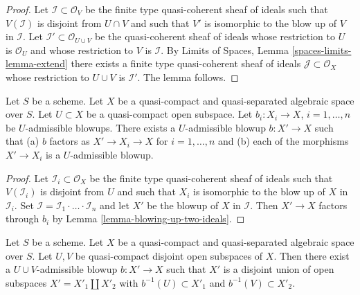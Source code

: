 \begin{proof}
Let $\mathcal{I} \subset \mathcal{O}_V$ be the finite type
quasi-coherent sheaf of ideals such that $V(\mathcal{I})$ is
disjoint from $U \cap V$ and such that $V'$ is isomorphic to the
blow up of $V$ in $\mathcal{I}$. Let
$\mathcal{I}' \subset \mathcal{O}_{U \cup V}$ be the quasi-coherent
sheaf of ideals whose restriction to $U$ is $\mathcal{O}_U$ and
whose restriction to $V$ is $\mathcal{I}$.
By Limits of Spaces, Lemma \ref{spaces-limits-lemma-extend}
there exists a finite type quasi-coherent sheaf of ideals
$\mathcal{J} \subset \mathcal{O}_X$ whose restriction to $U \cup V$ is
$\mathcal{I}'$. The lemma follows.
\end{proof}

\begin{lemma}
\label{lemma-dominate-admissible-blowups}
Let $S$ be a scheme.
Let $X$ be a quasi-compact and quasi-separated algebraic space over $S$.
Let $U \subset X$ be a quasi-compact open subspace.
Let $b_i : X_i \to X$, $i = 1, \ldots, n$ be $U$-admissible blowups.
There exists a $U$-admissible blowup $b : X' \to X$ such that
(a) $b$ factors as $X' \to X_i \to X$ for $i = 1, \ldots, n$ and
(b) each of the morphisms $X' \to X_i$ is a $U$-admissible blowup.
\end{lemma}

\begin{proof}
Let $\mathcal{I}_i \subset \mathcal{O}_X$ be the finite type
quasi-coherent sheaf of ideals such that $V(\mathcal{I}_i)$ is
disjoint from $U$ and such that $X_i$ is isomorphic to the
blow up of $X$ in $\mathcal{I}_i$. Set
$\mathcal{I} = \mathcal{I}_1 \cdot \ldots \cdot \mathcal{I}_n$
and let $X'$ be the blowup of $X$ in $\mathcal{I}$. Then
$X' \to X$ factors through $b_i$ by Lemma \ref{lemma-blowing-up-two-ideals}.
\end{proof}

\begin{lemma}
\label{lemma-separate-disjoint-opens-by-blowing-up}
Let $S$ be a scheme.
Let $X$ be a quasi-compact and quasi-separated algebraic space over $S$.
Let $U, V$ be quasi-compact disjoint open subspaces of $X$.
Then there exist a $U \cup V$-admissible blowup $b : X' \to X$
such that $X'$ is a disjoint union of open subspaces
$X' = X'_1 \amalg X'_2$ with $b^{-1}(U) \subset X'_1$ and
$b^{-1}(V) \subset X'_2$.
\end{lemma}

